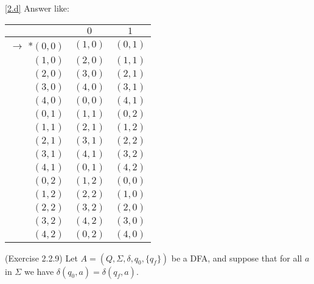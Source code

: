 \documentclass[10pt]{homework}
\begin{document}
\begin{solution}
  \ref{2.d} %
  Answer like:
  \begin{table}[h]
    \centering
    \begin{tabular}{r||c|c} %
      & $0$ & $1$\\\hline\hline  %
      $\rightarrow$ *$(0,0)$ & $(1,0)$ & $(0,1)$\\
      $(1,0)$ & $(2,0)$ & $(1,1)$\\
      $(2,0)$ & $(3,0)$ & $(2,1)$\\
      $(3,0)$ & $(4,0)$ & $(3,1)$\\
      $(4,0)$ & $(0,0)$ & $(4,1)$\\
      $(0,1)$ & $(1,1)$ & $(0,2)$\\
      $(1,1)$ & $(2,1)$ & $(1,2)$\\
      $(2,1)$ & $(3,1)$ & $(2,2)$\\
      $(3,1)$ & $(4,1)$ & $(3,2)$\\
      $(4,1)$ & $(0,1)$ & $(4,2)$\\
      $(0,2)$ & $(1,2)$ & $(0,0)$\\
      $(1,2)$ & $(2,2)$ & $(1,0)$\\
      $(2,2)$ & $(3,2)$ & $(2,0)$\\
      $(3,2)$ & $(4,2)$ & $(3,0)$\\
      $(4,2)$ & $(0,2)$ & $(4,0)$\\
    \end{tabular}
  \end{table}
\end{solution}

\begin{problem} (Exercise 2.2.9) Let
  $A = (Q, \Sigma, \delta, q_{0}, \{q_{f} \})$ be a DFA, and suppose that for
  all $a$ in $\Sigma$ we have $\delta(q_{0}, a) = \delta(q_{f}, a)$.
\end{problem}
\end{document}
